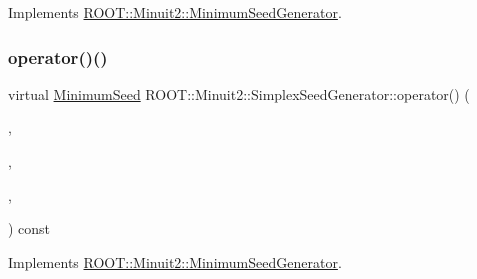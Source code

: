 Implements \mbox{\hyperlink{classROOT_1_1Minuit2_1_1MinimumSeedGenerator_ae71de52027d3f0c7fa202c7cf65b947a}{R\+O\+O\+T\+::\+Minuit2\+::\+Minimum\+Seed\+Generator}}.

\mbox{\label{classROOT_1_1Minuit2_1_1SimplexSeedGenerator_a48f1bb260753e6c6f053072d4754a028}} 
\subsubsection{\texorpdfstring{operator()()}{operator()()}\hspace{0.1cm}{\footnotesize\ttfamily [3/6]}}
{\footnotesize\ttfamily virtual \mbox{\hyperlink{classROOT_1_1Minuit2_1_1MinimumSeed}{Minimum\+Seed}} R\+O\+O\+T\+::\+Minuit2\+::\+Simplex\+Seed\+Generator\+::operator() (\begin{DoxyParamCaption}\item[{const \mbox{\hyperlink{classROOT_1_1Minuit2_1_1MnFcn}{Mn\+Fcn}} \&}]{,  }\item[{const \mbox{\hyperlink{classROOT_1_1Minuit2_1_1GradientCalculator}{Gradient\+Calculator}} \&}]{,  }\item[{const \mbox{\hyperlink{classROOT_1_1Minuit2_1_1MnUserParameterState}{Mn\+User\+Parameter\+State}} \&}]{,  }\item[{const \mbox{\hyperlink{classROOT_1_1Minuit2_1_1MnStrategy}{Mn\+Strategy}} \&}]{ }\end{DoxyParamCaption}) const\hspace{0.3cm}{\ttfamily [virtual]}}



Implements \mbox{\hyperlink{classROOT_1_1Minuit2_1_1MinimumSeedGenerator_ae71de52027d3f0c7fa202c7cf65b947a}{R\+O\+O\+T\+::\+Minuit2\+::\+Minimum\+Seed\+Generator}}.

\mbox{\label{classROOT_1_1Minuit2_1_1SimplexSeedGenerator_a483dc9272be849a23bcd0d29ac4e3b94}} 
